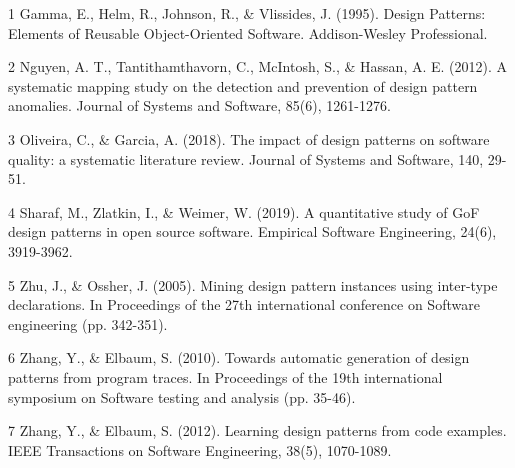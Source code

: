 \documentclass[conference]{IEEEtran}
\begin{document}
	\begin{thebibliography}{00}
		\item [1] Gamma, E., Helm, R., Johnson, R., \& Vlissides, J. (1995). Design Patterns: Elements of Reusable Object-Oriented Software. Addison-Wesley Professional.
		
		\item [2] Nguyen, A. T., Tantithamthavorn, C., McIntosh, S., \& Hassan, A. E. (2012). A systematic mapping study on the detection and prevention of design pattern anomalies. Journal of Systems and Software, 85(6), 1261-1276.
		
		\item [3] Oliveira, C., \& Garcia, A. (2018). The impact of design patterns on software quality: a systematic literature review. Journal of Systems and Software, 140, 29-51.
		
		\item [4] Sharaf, M., Zlatkin, I., \& Weimer, W. (2019). A quantitative study of GoF design patterns in open source software. Empirical Software Engineering, 24(6), 3919-3962.
		
		\item [5] Zhu, J., \& Ossher, J. (2005). Mining design pattern instances using inter-type declarations. In Proceedings of the 27th international conference on Software engineering (pp. 342-351).
		
		\item [6] Zhang, Y., \& Elbaum, S. (2010). Towards automatic generation of design patterns from program traces. In Proceedings of the 19th international symposium on Software testing and analysis (pp. 35-46).
		
		\item [7] Zhang, Y., \& Elbaum, S. (2012). Learning design patterns from code examples. IEEE Transactions on Software Engineering, 38(5), 1070-1089.
	\end{thebibliography}
\end{document}
